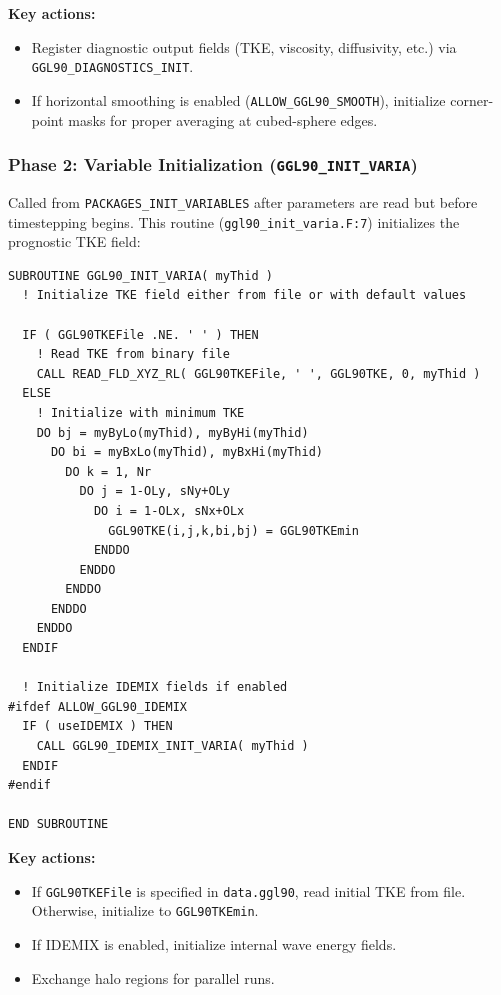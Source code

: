 \documentclass[12pt,letterpaper]{article}
\begin{document}
\textbf{Key actions:}
\begin{itemize}[leftmargin=*]
  \item Register diagnostic output fields (TKE, viscosity, diffusivity, etc.)
        via \texttt{GGL90\_DIAGNOSTICS\_INIT}.
  \item If horizontal smoothing is enabled (\texttt{ALLOW\_GGL90\_SMOOTH}),
        initialize corner-point masks for proper averaging at cubed-sphere
        edges.
\end{itemize}

\subsubsection{Phase 2: Variable Initialization (\texttt{GGL90\_INIT\_VARIA})}

Called from \texttt{PACKAGES\_INIT\_VARIABLES} after parameters are read but
before timestepping begins. This routine (\texttt{ggl90\_init\_varia.F:7})
initializes the prognostic TKE field:

\begin{lstlisting}[caption={\texttt{ggl90\_init\_varia.F}, lines 42--80 (excerpts) -- TKE initialization.}]
SUBROUTINE GGL90_INIT_VARIA( myThid )
  ! Initialize TKE field either from file or with default values

  IF ( GGL90TKEFile .NE. ' ' ) THEN
    ! Read TKE from binary file
    CALL READ_FLD_XYZ_RL( GGL90TKEFile, ' ', GGL90TKE, 0, myThid )
  ELSE
    ! Initialize with minimum TKE
    DO bj = myByLo(myThid), myByHi(myThid)
      DO bi = myBxLo(myThid), myBxHi(myThid)
        DO k = 1, Nr
          DO j = 1-OLy, sNy+OLy
            DO i = 1-OLx, sNx+OLx
              GGL90TKE(i,j,k,bi,bj) = GGL90TKEmin
            ENDDO
          ENDDO
        ENDDO
      ENDDO
    ENDDO
  ENDIF

  ! Initialize IDEMIX fields if enabled
#ifdef ALLOW_GGL90_IDEMIX
  IF ( useIDEMIX ) THEN
    CALL GGL90_IDEMIX_INIT_VARIA( myThid )
  ENDIF
#endif

END SUBROUTINE
\end{lstlisting}

\textbf{Key actions:}
\begin{itemize}[leftmargin=*]
  \item If \texttt{GGL90TKEFile} is specified in \texttt{data.ggl90}, read
        initial TKE from file. Otherwise, initialize to \texttt{GGL90TKEmin}.
  \item If IDEMIX is enabled, initialize internal wave energy fields.
  \item Exchange halo regions for parallel runs.
\end{itemize}
\end{document}
